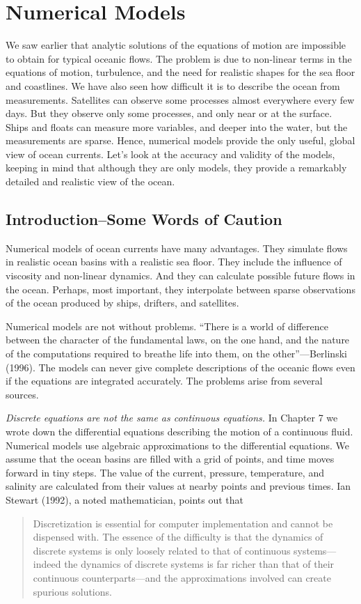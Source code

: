 \chapter{Numerical Models}
\addtocounter{figure}{1} We saw earlier that analytic solutions of the
equations of motion are impossible to obtain for typical oceanic
flows. The problem is due to non-linear terms in the equations of
motion, turbulence, and the need
for realistic shapes for the sea floor and coastlines. We have also
seen how difficult it is to describe the ocean from
measurements. Satellites can observe some processes almost everywhere
every few days. But they observe only some processes, and only near or
at the surface. Ships and floats can measure more variables, and
deeper into the water, but the measurements are sparse. Hence,
numerical models provide the only useful, global view of ocean
currents. Let's look at the accuracy
and validity of the models, keeping in mind that although they are
only models, they provide a remarkably detailed and realistic view of
the ocean.

\section{Introduction--Some Words of Caution}
Numerical models of ocean
currents have many advantages. They simulate flows in realistic ocean
basins with a realistic sea floor. They include the influence of
viscosity and non-linear dynamics. And they can calculate possible
future flows in the ocean. Perhaps, most important, they interpolate
between sparse observations of the ocean produced by ships,
drifters, and satellites.

Numerical models are not without problems. ``There is a world of
difference between the character of the fundamental laws, on the one
hand, and the nature of the computations required to breathe life into
them, on the other''---Berlinski (1996). The models can never give
complete descriptions of the oceanic flows even if the equations are
integrated accurately. The problems arise from several sources.

\textit{Discrete equations are not the same as continuous equations.}
In Chapter 7 we wrote down the differential equations describing the
motion of a continuous fluid. Numerical models use algebraic
approximations to the differential equations. We assume that the ocean
basins are filled with a grid of points, and time moves forward in
tiny steps. The value of the current, pressure, temperature, and
salinity are calculated from their values at nearby points and
previous times. Ian Stewart (1992), a noted mathematician, points out
that
\begin{quote} \small
Discretization is essential for computer implementation and cannot be
dispensed with. The essence of the difficulty is that the dynamics of
discrete systems is only loosely related to that of continuous
systems---indeed the dynamics of discrete systems is far richer than
that of their continuous counterparts---and the approximations
involved can create spurious solutions.
\end{quote}

